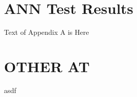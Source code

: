 
\section{ANN Test Results} \label{App:ANNTestResults}

Text of Appendix A is Here

\appendix
\section{OTHER AT}\label{testlabel}
asdf